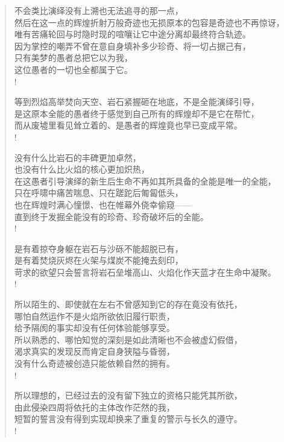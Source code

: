 \documentclass[UTF8, 12pt, a4paper]{ctexrep} %
\begin{document}
\begin{verse}
不会类比演绎没有上溯也无法追寻的那一点，\\
然后在这一点的辉煌折射万般奇迹也无损原本的包容是奇迹也不再惊讶，\\
唯有苦痛轮回与时隐时现的喧嚷让它中途分离却最终符合轨迹。\\
因为掌控的嘲弄不曾在意自身填补多少珍奇、将一切占据己有，\\
只有美梦的愚者总把它以为我，\\
这位愚者的一切也全都属于它。\\!

等到烈焰高举焚向天空、岩石紧握砸在地底，不是全能演绎引导，\\
是这原本全能的愚者终于感觉到自己所有的辉煌却不是它在帮忙，\\
而从废墟里看见耸立着的、是愚者的辉煌竟也早已变成平常。\\!

没有什么比岩石的丰碑更加卓然，\\
也没有什么比火焰的核心更加炽热，\\
在这愚者引导演绎的新生后生命不再如其所具备的全能是唯一的全能，\\
只在呼啸中痛苦喘息、只在蹉跎后匍匐低头，\\
也在辉煌时满心憧憬、也在帷幕外侥幸偷窥——\\
直到终于发掘全能没有的珍奇、珍奇破坏后的全能。\\!

是有着掠夺身躯在岩石与沙砾不能超脱已有，\\
是有着焚烧灰烬在火架与煤炭不能掩去刻印，\\
苛求的欲望只会誓言将岩石垒堆高山、火焰化作天蓝才在生命中凝聚。\\!

所以陌生的、即使就在左右不曾感知到它的存在竟没有依托，\\
哪怕自然运作不是火焰所欲依旧履行职责，\\
给予隔阂的事实却没有任何体验能够享受。\\
所以熟悉的、哪怕知觉的深刻是如此清晰也不会被虚幻假借，\\
渴求真实的发现反而肯定自身狭隘与昏弱，\\
没有什么奇迹被创造只能依赖自然的拥有。\\!

所以理想的，已经过去的没有留下独立的资格只能凭其所欲，\\
由此侵染四周将依托的主体改作茫然的我，\\
短暂的誓言没有得到实现却换来了重复的警示与长久的遵守。\\!


\end{verse}
\end{document}
